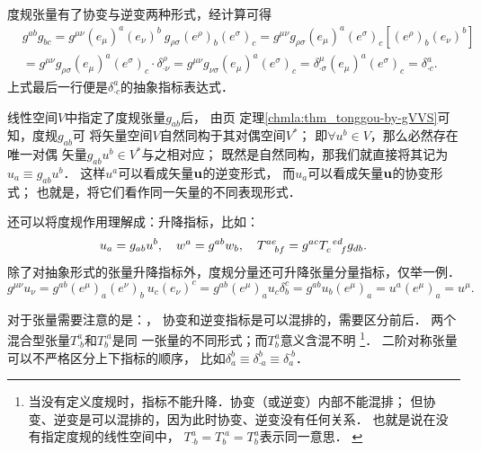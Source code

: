 度规张量有了协变与逆变两种形式，经计算可得
\begin{equation}
\begin{aligned}
    &g^{ab}g_{bc} = g^{\mu\nu} (e_\mu)^a (e_\nu)^b \ 
       g_{\rho\sigma} (e^\rho)_b (e^\sigma)_c
       =g^{\mu\nu}g_{\rho\sigma}(e_\mu)^a (e^\sigma)_c
       \left[(e^\rho)_b (e_\nu)^b \right] \\
    &= g^{\mu\nu}g_{\rho\sigma}(e_\mu)^a (e^\sigma)_c \cdot \delta^\rho _{\cdot \nu} 
     = g^{\mu\nu}g_{\nu\sigma}(e_\mu)^a (e^\sigma)_c 
    = \delta^\mu _{\cdot \sigma} (e_\mu)^a (e^\sigma)_c 
    = \delta^a_{\cdot c} .
\end{aligned}
\end{equation}
上式最后一行便是$\delta^a_{\cdot c}$的抽象指标表达式．


线性空间$V$中指定了度规张量$g_{ab}$后，
由\pageref{chmla:thm_tonggou-by-gVVS}页
定理\ref{chmla:thm_tonggou-by-gVVS}可知，度规$g_{ab}$可
将矢量空间$V${\kaishu 自然同构}于其对偶空间$V^*$；
即$\forall u^b \in V$，那么必然存在唯一对偶
矢量$g_{ab}u^b\in V^*$与之相对应；
既然是自然同构，那我们就直接将其记为$u_a \equiv g_{ab}u^b$．
这样$u^a$可以看成矢量$\bf u$的逆变形式，
而$u_a$可以看成矢量$\bf u$的协变形式；
也就是，将它们看作同一矢量的不同表现形式．


还可以将度规作用理解成：升降指标，比如：
\begin{equation*}
    u_a =g_{ab}u^b, \quad w^a=g^{ab}w_b, \quad
    T^{ae}_{\hphantom{ae} bf}=g^{ac}T^{\hphantom{c} ed}_{c \hphantom{ed} f}g_{db} .
\end{equation*}
除了对抽象形式的张量升降指标外，度规分量还可升降张量分量指标，仅举一例．
\begin{equation*}
    g^{\mu\nu} u_\nu = g^{ab} (e^\mu)_a (e^\nu)_b \ u_c (e_\nu)^c
    =g^{ab} (e^\mu)_a  u_c \delta^c_b
    =g^{ab} u_b (e^\mu)_a  = u^a(e^\mu)_a = u^\mu .
\end{equation*}


对于张量需要注意的是：{\kaishu{}}，
协变和逆变指标是{\heiti{}}可以混排的，需要区分前后．
两个混合型张量$T^{a}_{\cdot b}$和$T^{\cdot a}_{b}$是同
一张量的不同形式；而$T^{a}_{b}$意义含混不明
{\footnote{当没有定义度规时，指标不能升降．协变（或逆变）内部不能混排；
        但协变、逆变是可以混排的，因为此时协变、逆变没有任何关系．
        也就是说在没有指定度规的线性空间中，
        $T^{a}_{\cdot b}=T^{\cdot a}_{b}=T^{a}_{b}$表示同一意思．
        \label{chdm:ft_index}}}．
二阶{\kaishu 对称}张量可以不严格区分上下指标的顺序，
比如$\delta_{a}^{b}\equiv \delta_{\cdot a}^{b}\equiv \delta_{a}^{\cdot b}$．


